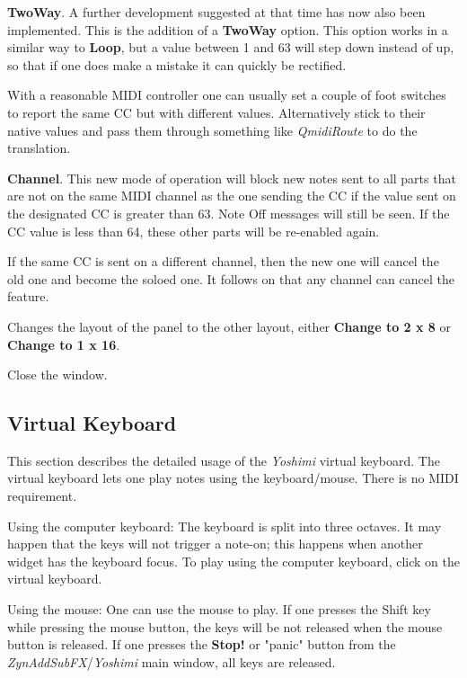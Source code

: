    \textbf{TwoWay}.
   A further development suggested at that time has now also been implemented. This
   is the addition of a \textbf{TwoWay} option.
   This option works in a similar way to \textbf{Loop}, but
   a value between 1 and 63 will step down instead of up, so that if one does make
   a mistake it can quickly be rectified.

   With a reasonable MIDI controller one can usually set a couple of foot switches
   to report the same CC but with different values. Alternatively stick to their
   native values and pass them through something like \textsl{QmidiRoute} to do the
   translation.

   \textbf{Channel}.
   This new mode of operation will block new notes sent to all parts that are not
   on the same MIDI channel as the one sending the CC if the value sent on the
   designated CC is greater than 63. Note Off messages will still be seen. If the
   CC value is less than 64, these other parts will be re-enabled again.

   If the same CC is sent on a different channel, then the new one will cancel the
   old one and become the soloed one. It follows on that any channel can cancel the
   feature.

   Changes the layout of the panel to the other layout, either
   \textbf{Change to 2 x 8} or
   \textbf{Change to 1 x 16}.

   Close the window.

\subsection{Virtual Keyboard}
\label{subsec:virtual_keyboard}

   This section describes the detailed usage of the
   \textsl{Yoshimi} virtual keyboard.
   The virtual keyboard lets one play notes using the keyboard/mouse. There is
   no MIDI requirement.

   Using the computer keyboard: The keyboard is split into three octaves.
   It may happen that the keys will not trigger a note-on;
   this happens when another widget has the keyboard focus.
   To play using the computer keyboard, click on the virtual keyboard.

   Using the mouse: One can use the mouse to play.  If one presses the
   Shift key while pressing the mouse button, the keys will be not released
   when the mouse button is released.  If one presses the \textbf{Stop!} or
   "panic" button from the \textsl{ZynAddSubFX}/\textsl{Yoshimi} main window,
   all keys are released.

